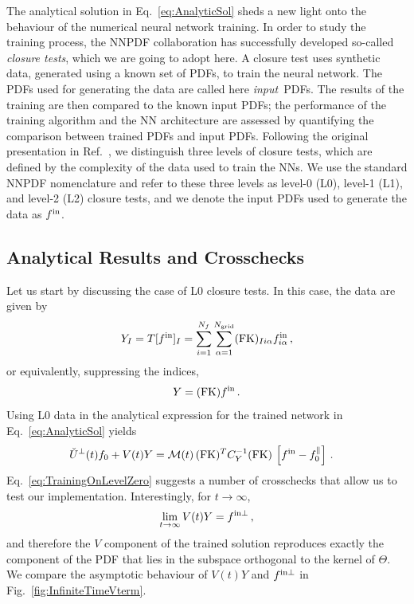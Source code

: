 The analytical solution in Eq.~\eqref{eq:AnalyticSol} sheds a new light onto the
behaviour of the numerical neural network training. In order to study the
training process, the NNPDF collaboration has successfully developed so-called
{\em closure tests}, which we are going to adopt here. A closure test uses synthetic data, 
generated using a known
set of PDFs, to train the neural network. The PDFs used for generating the data
are called here {\em input}\ PDFs. The results of the training are then compared
to the known input PDFs; the performance of the training algorithm and the NN
architecture are assessed by quantifying the comparison between trained PDFs and
input PDFs. Following the original presentation in Ref.~\cite{NNPDF:2014otw}, we
distinguish three levels of closure tests, which are defined by the complexity
of the data used to train the NNs. We use the standard NNPDF nomenclature and
refer to these three levels as level-0 (L0), level-1 (L1), and level-2 (L2)
closure tests, and we denote the input PDFs used to generate the data as $f^{\rm in}$.

\subsection{Analytical Results and Crosschecks}
\label{sec:AnalyticalChecks}
Let us start by discussing the case of L0 closure tests. In this case, the data are
given by
\begin{equation}
    \label{eq:DataL0}
    Y_I = T[f^{\rm in}]_I
        = \sum_{i=1}^{N_{f}} \sum_{\alpha=1}^{N_{\mathrm{grid}}} (\mathrm{FK})_{Ii\alpha} f^{\rm in}_{i\alpha}\, ,
\end{equation}
or equivalently, suppressing the indices,
\begin{equation}
    \label{eq:DataL0NoIndices}
    Y = (\mathrm{FK}) f^{\rm in}\, .
\end{equation}
Using L0 data in the analytical expression for the trained network in
Eq.~\eqref{eq:AnalyticSol} yields
\begin{align}
  \label{eq:TrainingOnLevelZero}
  \check{U}^\perp(t) f_0 + V(t) Y 
    &= \mathcal{M}(t)\, (\mathrm{FK})^T C_{Y}^{-1} (\mathrm{FK})\, 
      \left[f^{\rm in} - f_{0}^\parallel\right]\, .
\end{align}
Eq.~\eqref{eq:TrainingOnLevelZero} suggests a number of crosschecks that allow us to test our
implementation. Interestingly, for $t\to\infty$,
\begin{align}
    \label{eq:LevelZeroClosureInfiniteTraining}
    \lim_{t\to\infty} V(t) Y = f^{\rm in \perp}\, ,
\end{align}
and therefore the $V$ component of the trained solution reproduces exactly the
component of the PDF that lies in  the subspace orthogonal to the kernel of
$\Theta$. We compare the asymptotic behaviour of $V(t) Y$ and $f^{\rm in \perp}$ in 
Fig.~\ref{fig:InfiniteTimeVterm}.


